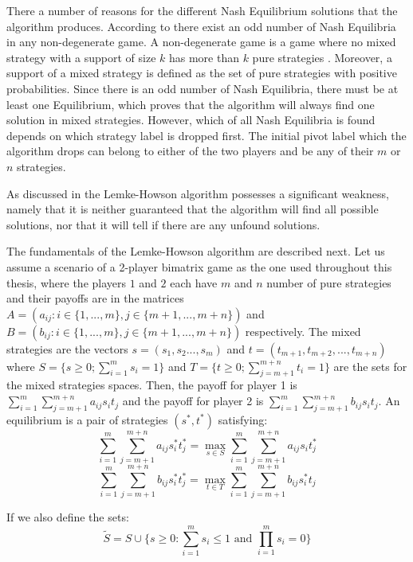 {There a number of reasons for the different Nash Equilibrium solutions that the algorithm produces. According to \citet{lemke1964equilibrium} there exist an odd number of Nash Equilibria in any non-degenerate game. A non-degenerate game is a game where no mixed strategy with a support of size $k$ has more than $k$ pure strategies \citep{nisan2007algorithmic}. Moreover, a support of a mixed strategy is defined as the set of pure strategies with positive probabilities. Since there is an odd number of Nash Equilibria, there must be at least one Equilibrium, which proves that the algorithm will always find one solution in mixed strategies. However, which of all Nash Equilibria is found depends on which strategy label is dropped first. The initial pivot label which the algorithm drops can belong to either of the two players and be any of their $m$ or $n$ strategies.

As discussed in \citet{shapley1974note} the Lemke-Howson algorithm possesses a significant weakness, namely that it is neither guaranteed that the algorithm will find all possible solutions, nor that it will tell if there are any unfound solutions.

The fundamentals of the Lemke-Howson algorithm are described next. Let us assume a scenario of a 2-player bimatrix game as the one used throughout this thesis, where the players $1$ and $2$ each have $m$ and $n$ number of pure strategies and their payoffs are in the matrices $A = (a_{ij}: i \in \{1,...,m\}, j \in \{ m+1,...,m+n\})$ and $B = (b_{ij}: i \in \{1,...,m\}, j \in \{m+1,...,m+n\})$ respectively. The mixed strategies are the vectors $s=(s_1,s_2...,s_m)$ and $t=(t_{m+1},t_{m+2},...,t_{m+n})$ where $S = \{s \geq 0; \sum_{i=1}^{m}s_i = 1\}$ and $T = \{t \geq 0; \sum_{j=m+1}^{m+n}t_i = 1\}$ are the sets for the mixed strategies spaces. Then, the payoff for player 1 is $\sum_{i=1}^{m}\sum_{j=m+1}^{m+n} a_{ij} s_i t_j$ and the payoff for player 2 is $\sum_{i=1}^{m} \sum_{j=m+1}^{m+n} b_{ij} s_i t_j$. An equilibrium is a pair of strategies $(s^*,t^*)$ satisfying:
\begin{equation}
\sum_{i=1}^{m} \sum_{j=m+1}^{m+n} a_{ij}s_i^*t_j^* = \max_{s \in S} \sum_{i=1}^{m} \sum_{j=m+1}^{m+n} a_{ij}s_i t_j^*
\end{equation}
\begin{equation}
\sum_{i=1}^{m} \sum_{j=m+1}^{m+n} b_{ij}s_i^*t_j^* = \max_{t \in T} \sum_{i=1}^{m} \sum_{j=m+1}^{m+n} b_{ij}s_i^* t_j
\end{equation}


If we also define the sets:
\begin{equation}
\tilde{S} =  S \cup \{ s \geq 0: \sum_{i=1}^{m} s_i \leq 1 \text{ and } \prod_{i=1}^{m} s_i = 0 \}
\end{equation}

}
